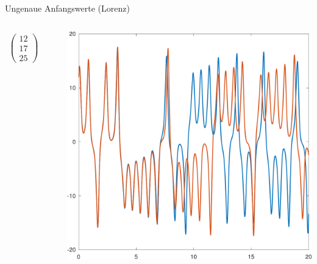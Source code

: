 \documentclass[notheorems,hidelinks,aspectratio=1610]{beamer}
\begin{document}
\begin{frame}{Ungenaue Anfangswerte (Lorenz)}
  \begin{columns}
    \begin{column}{.4\textwidth}
      \begin{gather*}
        \begin{pmatrix}
          12\\17\\25
        \end{pmatrix}
        \qquad\text{und}\qquad
        \begin{pmatrix}
          12\\17\\24.99
        \end{pmatrix}
      \end{gather*}
    \end{column}
    \begin{column}{.6\textwidth}
      \includegraphics[width=.95\textwidth]{fig/lorenz-initial-crop.pdf}
    \end{column}
  \end{columns}
\end{frame}
\end{document}
